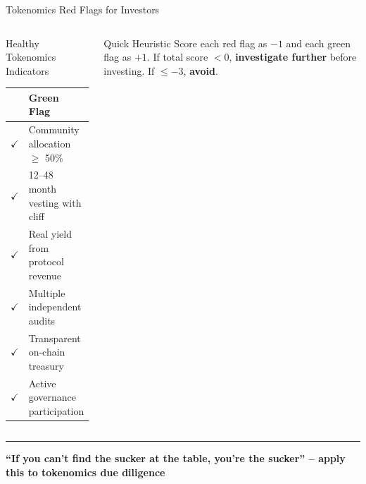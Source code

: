 \documentclass[8pt,aspectratio=169]{beamer}
\newcommand{\bottomnote}[1]{\vfill\vspace{-2mm}\textcolor{mllavender2}{\rule{\textwidth}{0.4pt}}\vspace{1mm}\footnotesize\textbf{#1}}
\begin{document}
\begin{frame}{Tokenomics Red Flags for Investors}
\begin{columns}[T]
\begin{block}{Healthy Tokenomics Indicators}
\footnotesize
\renewcommand{\arraystretch}{1.15}
\begin{tabular}{cp{4.5cm}}
\toprule
& \textbf{Green Flag} \\
\midrule
\textcolor{mlgreen}{\Large$\checkmark$} & Community allocation $\geq$ 50\% \\
\textcolor{mlgreen}{\Large$\checkmark$} & 12--48 month vesting with cliff \\
\textcolor{mlgreen}{\Large$\checkmark$} & Real yield from protocol revenue \\
\textcolor{mlgreen}{\Large$\checkmark$} & Multiple independent audits \\
\textcolor{mlgreen}{\Large$\checkmark$} & Transparent on-chain treasury \\
\textcolor{mlgreen}{\Large$\checkmark$} & Active governance participation \\
\bottomrule
\end{tabular}
\end{block}
\vspace{2mm}
\begin{exampleblock}{\footnotesize Quick Heuristic}
\footnotesize
Score each red flag as $-1$ and each green flag as $+1$. If total score $< 0$, \textbf{investigate further} before investing. If $\leq -3$, \textbf{avoid}.
\end{exampleblock}
\end{columns}
\bottomnote{``If you can't find the sucker at the table, you're the sucker'' -- apply this to tokenomics due diligence}
\end{frame}
\end{document}
